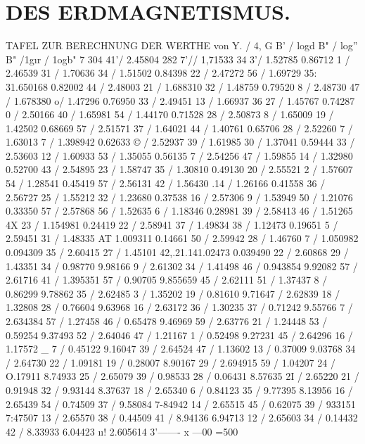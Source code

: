 \documentclass[12pt,a4paper]{article}
\begin{document}
\section*{DES ERDMAGNETISMUS.}
TAFEL ZUR BERECHNUNG DER WERTHE von Y. / 4, \textdegree{} G B' / logd B" / log'' B" /1g\i{}r /\textregistered{} 1ogb" 7 304\textdegree{} 41'/ 2.45804 282\textdegree{} 7'// 1,71533 34\textdegree{} 3'/ 1.52785 0.86712 1 / 2.46539 31 / 1.70636 34 / 1.51502 0.84398 22 / 2.47272 56 / 1.69729 35: 31.650168 0.82002 44 / 2.48003 21 / 1.688310 32 / 1.48759 0.79520 8 / 2.48730 47 / 1.678380 o/ 1.47296 0.76950 33 / 2.49451 13 / 1.66937 36 27 / 1.45767 0.74287 0 / 2.50166 40 / 1.65981 54 / 1.44170 0.71528 28 / 2.50873 8 / 1.65009 19 / 1.42502 0.68669 57 / 2.51571 37 / 1.64021 44 / 1.40761 0.65706 28 / 2.52260 7 / 1.63013 7 / 1.398942 0.62633 \copyright{} / 2.52937 39 / 1.61985 30 / 1.37041 0.59444 33 / 2.53603 12 / 1.60933 53 / 1.35055 0.56135 7 / 2.54256 47 / 1.59855 14 / 1.32980 0.52700 43 / 2.54895 23 / 1.58747 35 / 1.30810 0.49130 20 / 2.55521 2 / 1.57607 54 / 1.28541 0.45419 57 / 2.56131 42 / 1.56430 .14 / 1.26166 0.41558 36 / 2.56727 25 / 1.55212 32 / 1.23680 0.37538 16 / 2.57306 9 / 1.53949 50 / 1.21076 0.33350 57 / 2.57868 56 / 1.52635 6 / 1.18346 0.28981 39 / 2.58413 46 / 1.51265 4X 23 / 1.154981 0.24419 22 / 2.58941 37 / 1.49834 38 / 1.12473 0.19651 5 / 2.59451 31 / 1.48335 AT 1.009311 0.14661 50 / 2.59942 28 / 1.46760 7 / 1.050982 0.094309 35 / 2.60415 27 / 1.45101 42,\textdegree{}.21.141.02473 0.039490 22 / 2.60868 29 / 1.43351 34 / 0.98770 9.98166 9 / 2.61302 34 / 1.41498 46 / 0.943854 9.92082 57 / 2.61716 41 / 1.395351 57 / 0.90705 9.855659 45 / 2.62111 51 /  1.37437 8 / 0.86299 9.78862 35 / 2.62485 3 / 1.35202 19 / 0.81610 9.71647 / 2.62839 18 / 1.32808 28 / 0.76604 9.63968 16 / 2.63172 36 / 1.30235 37 / 0.71242 9.55766 7 / 2.634384 57 / 1.27458 46 / 0.65478 9.46969 59 / 2.63776 21 / 1.24448 53 / 0.59254 9.37493 52 / 2.64046 47 / 1.21167 1 / 0.52498 9.27231 45 / 2.64296 16 / 1.17572 \_ 7 / 0.45122 9.16047 39 / 2.64524 47 / 1.13602 13 / 0.37009 9.03768 34 / 2.64730 22 / 1.09181 19 / 0.28007 8.90167 29 / 2.694915 59 / 1.04207 24 / O.17911 8.74933 25 / 2.65079 39 / 0.98533 28 / 0.06431 8.57635 2I / 2.65220 21 / 0.91948 32 / 9.93144 8.37637 18 / 2.65340 6 / 0.84123 35 / 9.77395 8.13956 16 / 2.65439 54 / 0.74509 37 / 9.58084 7-84942 14 / 2.65515 45 / 0.62075 39 / 933151 7:47507 13 / 2.65570 38 / 0.44509 41 / 8.94136 6.94713 12 / 2.65603 34 / 0.14432 42 / 8.33933 6.04423 \i{}\i{}! 2.605614 3'------- x ---00 =500
\end{document}
